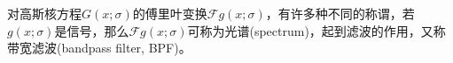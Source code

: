 \begin{subappendices}
对高斯核方程$G(x;\sigma)$的傅里叶变换$\mathcal{F} g(x;\sigma)$，有许多种不同的称谓，若$g(x;\sigma)$是信号，那么$\mathcal{F} g(x;\sigma)$可称为光谱(spectrum)，起到滤波的作用，又称带宽滤波(bandpass filter, BPF)。





\end{subappendices}
